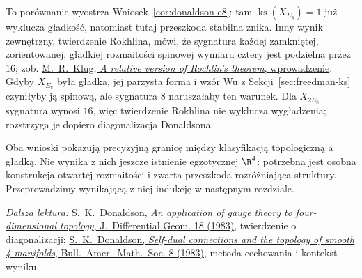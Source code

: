 To porównanie wyostrza Wniosek~\ref{cor:donaldson-e8}:
tam $\operatorname{ks}(X_{E_8})=1$ już wyklucza
gładkość, natomiast tutaj przeszkoda stabilna znika.
Inny wynik zewnętrzny, twierdzenie Rokhlina, mówi,
że sygnatura każdej zamkniętej, zorientowanej,
gładkiej rozmaitości spinowej wymiaru cztery
jest podzielna przez $16$;
zob. \href{https://arxiv.org/pdf/2011.12418}
{M.~R.~Klug, \emph{A relative version of Rochlin's theorem},
wprowadzenie}. Gdyby $X_{E_8}$ była gładka,
jej parzysta forma i wzór Wu z
Sekcji~\ref{sec:freedman-ks} czyniłyby ją spinową,
ale sygnatura $8$ naruszałaby ten warunek.
Dla $X_{2E_8}$ sygnatura wynosi $16$, więc
twierdzenie Rokhlina nie wyklucza wygładzenia;
rozstrzyga je dopiero diagonalizacja Donaldsona.

Oba wnioski pokazują precyzyjną granicę między
klasyfikacją topologiczną a gładką. Nie wynika z nich
jeszcze istnienie egzotycznej $\R^4$: potrzebna jest
osobna konstrukcja otwartej rozmaitości i zwarta
przeszkoda rozróżniająca struktury. Przeprowadzimy
wynikającą z niej indukcję w następnym rozdziale.

\par\smallskip
{\footnotesize\noindent\emph{Dalsza lektura:}
\href{https://doi.org/10.4310/jdg/1214437665}
{S.~K.~Donaldson, \emph{An application of gauge theory to
four-dimensional topology}, J.~Differential Geom. 18 (1983)},
twierdzenie o diagonalizacji;
\href{https://www.math.miami.edu/~cscaduto/teaching/782-fall-2023/notes/D.pdf}
{S.~K.~Donaldson, \emph{Self-dual connections and the topology
of smooth 4-manifolds}, Bull.~Amer.~Math.~Soc. 8 (1983)},
metoda cechowania i kontekst wyniku.\par}
